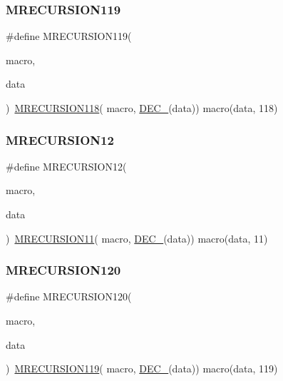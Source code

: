 \subsubsection{\texorpdfstring{MRECURSION119}{MRECURSION119}}
{\footnotesize\ttfamily \#define M\+R\+E\+C\+U\+R\+S\+I\+O\+N119(\begin{DoxyParamCaption}\item[{}]{macro,  }\item[{}]{data }\end{DoxyParamCaption})~\mbox{\hyperlink{group__group__sam0__utils__mrecursion_ga8559a2809b8bf465f91a9cf40bb88b16}{M\+R\+E\+C\+U\+R\+S\+I\+O\+N118}}(  macro, \mbox{\hyperlink{group__group__sam0__utils__mrecursion_ga1d23d683797679dca8c3512a54a5dcae}{D\+E\+C\+\_\+}}(data))   macro(data, 118)}

\mbox{\label{group__group__sam0__utils__mrecursion_ga2729e6d7bf9ad170f0b715d38b75e5b8}} 
\subsubsection{\texorpdfstring{MRECURSION12}{MRECURSION12}}
{\footnotesize\ttfamily \#define M\+R\+E\+C\+U\+R\+S\+I\+O\+N12(\begin{DoxyParamCaption}\item[{}]{macro,  }\item[{}]{data }\end{DoxyParamCaption})~\mbox{\hyperlink{group__group__sam0__utils__mrecursion_ga31b84f80986b74ca2475b949b3fb83e0}{M\+R\+E\+C\+U\+R\+S\+I\+O\+N11}}(  macro, \mbox{\hyperlink{group__group__sam0__utils__mrecursion_ga1d23d683797679dca8c3512a54a5dcae}{D\+E\+C\+\_\+}}(data))   macro(data, 11)}

\mbox{\label{group__group__sam0__utils__mrecursion_ga5efb0e5825610432e0101ca6efdcb33d}} 
\subsubsection{\texorpdfstring{MRECURSION120}{MRECURSION120}}
{\footnotesize\ttfamily \#define M\+R\+E\+C\+U\+R\+S\+I\+O\+N120(\begin{DoxyParamCaption}\item[{}]{macro,  }\item[{}]{data }\end{DoxyParamCaption})~\mbox{\hyperlink{group__group__sam0__utils__mrecursion_gadc32038d19a1b3fafd088520e9b5e8d8}{M\+R\+E\+C\+U\+R\+S\+I\+O\+N119}}(  macro, \mbox{\hyperlink{group__group__sam0__utils__mrecursion_ga1d23d683797679dca8c3512a54a5dcae}{D\+E\+C\+\_\+}}(data))   macro(data, 119)}

